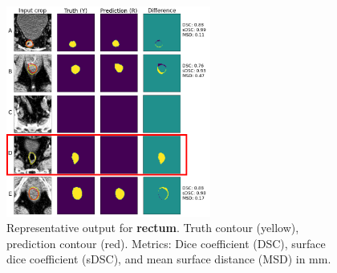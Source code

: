 \documentclass[9pt]{beamer}
\begin{document}
\begin{frame}{}
  \begin{figure}
    \includegraphics[width=0.60\textwidth]{images/prostate_rectum_missed}
    \caption{Representative output for \textbf{rectum}. Truth contour (yellow),
      prediction contour (red).
      Metrics: Dice coefficient (DSC), surface dice coefficient (sDSC), and mean
      surface distance (MSD) in mm.}
  \end{figure}
\end{frame}
%
%   
%
\end{document}
